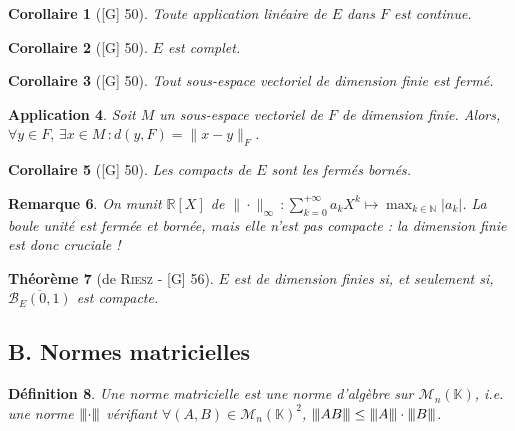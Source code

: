 \documentclass[10pt, a4paper, parskip=full, twoside, twocolumn]{report}
\newtheorem{definition}{Définition}
\newtheorem{theorem}[definition]{Théorème}
\newtheorem{corollary}[definition]{Corollaire}
\newtheorem{remark}[definition]{Remarque}
\newtheorem{application}[definition]{Application}
\newcommand{\IN}{\mathbb{N}}
\newcommand{\IK}{\mathbb{K}}
\newcommand{\IR}{\mathbb{R}}
\newcommand{\M}{\mathcal{M}}
\newcommand{\B}{\mathcal{B}}
\newcommand{\vertiii}[1]{{\left\vert\kern-0.25ex\left\vert\kern-0.25ex\left\vert #1 
    \right\vert\kern-0.25ex\right\vert\kern-0.25ex\right\vert}}
\begin{document}
\begin{corollary}[\textnormal{[G] 50}]
	Toute application linéaire de $E$ dans $F$ est continue.
\end{corollary}

\begin{corollary}[\textnormal{[G] 50}]
	$E$ est complet.
\end{corollary}

\begin{corollary}[\textnormal{[G] 50}]
	Tout sous-espace vectoriel de dimension finie est fermé.
\end{corollary}

\begin{application}
	Soit $M$ un sous-espace vectoriel de $F$ de dimension finie.
	Alors, $\forall y\in F,\,\exists x\in M\,\colon d(y,F) = \|x-y\|_F$.
\end{application}

\begin{corollary}[\textnormal{[G] 50}]
	Les compacts de $E$ sont les fermés bornés.
\end{corollary}

\begin{remark}
	On munit $\IR[X]$ de $\|\cdot\|_{\infty}\,\colon \sum_{k=0}^{+\infty}a_kX^k\mapsto \max_{k\in\IN} \vert a_k\vert$.
	La boule unité est fermée et bornée, mais elle n'est pas compacte : la dimension finie est donc cruciale !
\end{remark}

\begin{tcolorbox}[
    breakable, %
    colback=developpement, %
    colframe=gray!0!black, %
    boxrule=0pt, %
    arc=1mm, %
	boxsep=0pt,
	left=0pt, right=0pt, top=0pt, bottom=0pt
]
\begin{theorem}[de \textsc{Riesz} - \textnormal{[G] 56}]
	\label{208dev12}
	$E$ est de dimension finies si, et seulement si, $\overline{\B_E(0,1)}$ est compacte.
\end{theorem}
\end{tcolorbox}


\subsection*{B. Normes matricielles}

\begin{definition}
Une \emph{norme matricielle} est une norme d'algèbre sur $\M_n(\IK)$, \emph{i.e.} une norme $\vertiii{\cdot}$ vérifiant $\forall (A,B)\in\M_n(\IK)^2$, $\vertiii{AB}\leq \vertiii{A}\cdot\vertiii{B}$.
\end{definition}
\end{document}
